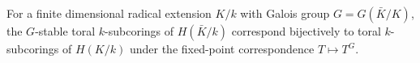 For a finite dimensional radical extension $K/k$ with Galois group $G = G(\bar{K}/K)$, the $G$-stable toral $k$-subcorings of $H(\bar{K}/k)$ correspond bijectively to toral $k$-subcorings of $H(K/k)$ under the fixed-point correspondence $T \mapsto T^G$.
